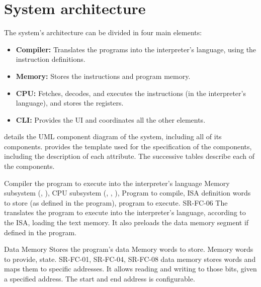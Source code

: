 \section{System architecture}\label{sec:architecture}
The system's architecture can be divided in four main elements:
\begin{itemize}
  \item \textbf{Compiler:} Translates the  programs into the \gls{interpreter}'s language, using the \gls{instruction} definitions.
  \item \textbf{Memory:} Stores the \glspl{instruction} and program memory.
  \item \textbf{\gls{CPU}:} Fetches, decodes, and executes the \glspl{instruction} (in the interpreter's language), and stores the \glspl{register}.
  \item \textbf{\gls{CLI}:} Provides the \gls{UI} and coordinates all the other elements.
\end{itemize}

 details the UML component diagram \parencite{Cook2017} of the system, including all of its components.  provides the template used for the specification of the components, including the description of each attribute. The successive tables describe each of the components.




\begin{component}{Compiler}
  { the program to execute into the interpreter's language}  %
  {Memory subsystem (, ), CPU subsystem (, , ), }  %
  {Program to compile, \gls{ISA} definition}  %
  { words to store (as defined in the program), program to execute.}  %
  {SR-FC-06}  %
  The  translates the  program to execute into the interpreter's language, according to the \gls{ISA}, loading the \gls{text memory}. It also preloads the \gls{data memory} segment if defined in the program.
\end{component}

\begin{component}{Data Memory}
  {Stores the program's data}  %
  {\NA}  %
  {Memory \glspl{word} to store.}  %
  {Memory \glspl{word} to provide, state.}  %
  {SR-FC-01, SR-FC-04, SR-FC-08}  %
  \Gls{data memory} stores \glspl{word} and maps them to specific addresses. It allows reading and writing to those bits, given a specified address. The start and end address is configurable.
\end{component}

